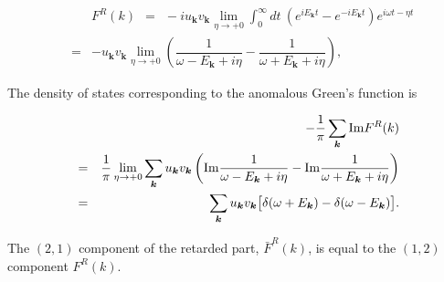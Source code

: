 \documentclass[uplatex,a4j,12pt,dvipdfmx]{jsarticle}
\begin{document}
\begin{eqnarray}
	&&
	F^{R}(k)
	\ \ = \ \
	- i
	u_{\bm{k}}
	v_{\bm{k}}
	\lim_{\eta \to +0}
	\int^{\infty}_{0} \!\! dt \
	\left(
	e^{ i E_{\bm{k}} t }
	-
	e^{ - i E_{\bm{k}} t }
	\right)
	e^{i \omega t - \eta t}
	\nonumber \\ &=&
	-
	u_{\bm{k}} v_{\bm{k}}
	\lim_{\eta \to +0}
	\left(
	\dfrac{1}{\omega - E_{\bm{k}} + i \eta }
	-
	\dfrac{1}{\omega + E_{\bm{k}} + i \eta }
	\right)
	,
\end{eqnarray}

The density of states corresponding to the anomalous Green's function is

\begin{eqnarray}
	&&
	-
	\dfrac{ 1 }{ \pi }
	\sum_{\bm{k}}
	{\rm Im} F^{R}(k)
	\nonumber \\ &=&
	\dfrac{ 1 }{ \pi }
	\lim_{\eta \to +0}
	\sum_{\bm{k}}
	u_{\bm{k}} v_{\bm{k}}
	\left(
	{\rm Im}
	\dfrac{1}{\omega - E_{\bm{k}} + i \eta }
	-
	{\rm Im}
	\dfrac{1}{\omega + E_{\bm{k}} + i \eta }
	\right)
	\nonumber \\ &=&
	\sum_{\bm{k}}
	u_{\bm{k}} v_{\bm{k}}
	\big[
		\delta( \omega + E_{\bm{k}} )
		-
		\delta( \omega - E_{\bm{k}} )
		\big]
	.
	\nonumber \\
\end{eqnarray}


The $(2,1)$ component of the retarded part, $\bar{F}^{R}(k)$, is equal to the $(1,2)$ component $F^{R}(k)$.
\end{document}

